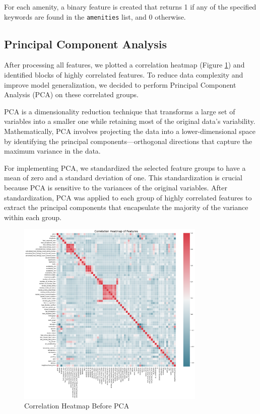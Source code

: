 \documentclass[12pt]{article}
\begin{document}
For each amenity, a binary feature is created that returns 1 if any of the specified keywords are found in the \texttt{amenities} list, and 0 otherwise.

\subsection{Principal Component Analysis}

After processing all features, we plotted a correlation heatmap (Figure \ref{fig:correlation_before}) and identified blocks of highly correlated features. To reduce data complexity and improve model generalization, we decided to perform Principal Component Analysis (PCA) on these correlated groups.

PCA is a dimensionality reduction technique that transforms a large set of variables into a smaller one while retaining most of the original data's variability. Mathematically, PCA involves projecting the data into a lower-dimensional space by identifying the principal components—orthogonal directions that capture the maximum variance in the data.

For implementing PCA, we standardized the selected feature groups to have a mean of zero and a standard deviation of one. This standardization is crucial because PCA is sensitive to the variances of the original variables. After standardization, PCA was applied to each group of highly correlated features to extract the principal components that encapsulate the majority of the variance within each group.

\begin{figure}[H]
\centering
\includegraphics[width=0.8\textwidth]{images/correlation_before.png}
\caption{Correlation Heatmap Before PCA}
\label{fig:correlation_before}
\end{figure}
\end{document}
